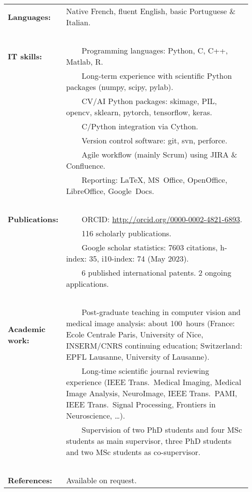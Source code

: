 \documentclass[english,10pt,a4paper]{scrartcl}
\newcommand{\tabitem}{~~\llap{\textbullet}~~}
\begin{document}
\begin{tabular}{p{0.2\linewidth}p{0.8\linewidth}}
  \textbf{Languages:} & Native French, fluent English, basic Portuguese \& Italian.\\
  \ \\
  \textbf{IT skills:} &
  \tabitem Programming languages: Python, C, C++, Matlab, R.\\
  & \tabitem Long-term experience with scientific Python packages (numpy, scipy, pylab).\\
  & \tabitem CV/AI Python packages: skimage, PIL, opencv, sklearn, pytorch, tensorflow, keras.\\
  & \tabitem C/Python integration via Cython.\\
  & \tabitem Version control software: git, svn, perforce.\\
  & \tabitem Agile workflow (mainly Scrum) using JIRA \& Confluence.\\
  & \tabitem Reporting: \LaTeX, MS~Office, OpenOffice, LibreOffice, Google~Docs.\\
  \ \\
  \textbf{Publications:} &
  \tabitem ORCID: \url{http://orcid.org/0000-0002-4821-6893}.\\
  & \tabitem 116 scholarly publications.\\
  & \tabitem Google scholar statistics: 7603 citations, h-index: 35, i10-index: 74 (May 2023).\\
  & \tabitem 6 published international patents. 2 ongoing applications.\\
  \ \\
  \textbf{Academic work:} & 
  \tabitem Post-graduate teaching in computer vision and medical image analysis: about 100~hours (France: Ecole Centrale Paris, University of Nice, INSERM/CNRS continuing education; Switzerland: EPFL Lausanne, University of Lausanne).\\
  & \tabitem Long-time scientific journal reviewing experience (IEEE Trans.~Medical Imaging, Medical Image Analysis, NeuroImage, IEEE Trans.~PAMI, IEEE Trans.~Signal Processing, Frontiers in Neuroscience, \ldots).\\
  & \tabitem Supervision of two PhD students and four MSc students as main supervisor, three PhD students and two MSc students as co-supervisor.\\
  \ \\
  \textbf{References:} & Available on request.
\end{tabular}



%
\end{document}
